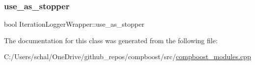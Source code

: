 \subsubsection{\texorpdfstring{use\+\_\+as\+\_\+stopper}{use\_as\_stopper}}
{\footnotesize\ttfamily bool Iteration\+Logger\+Wrapper\+::use\+\_\+as\+\_\+stopper\hspace{0.3cm}{\ttfamily [private]}}



The documentation for this class was generated from the following file\+:\begin{DoxyCompactItemize}
\item 
C\+:/\+Users/schal/\+One\+Drive/github\+\_\+repos/compboost/src/\mbox{\hyperlink{compboost__modules_8cpp}{compboost\+\_\+modules.\+cpp}}\end{DoxyCompactItemize}
